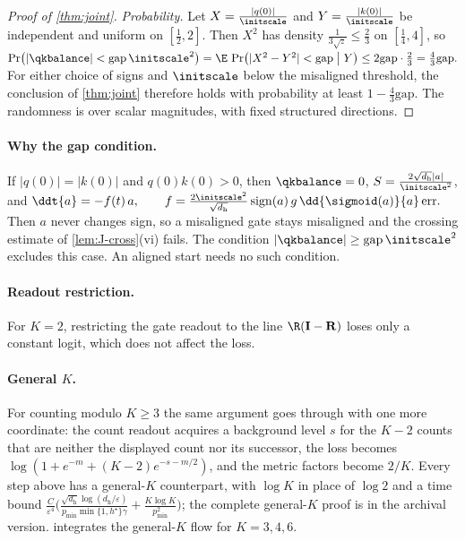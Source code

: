 \begin{proof}[Proof of \cref{thm:joint}]
\emph{Probability.} Let $X=\frac{|q(0)|}{\initscale}$ and $Y=\frac{|k(0)|}{\initscale}$ be independent and uniform on $[\frac{1}{2},2]$. Then $X^2$ has density
$\frac{1}{3\sqrt z}\le\frac{2}{3}$ on $[\frac{1}{4},4]$, so
 $\Pr\bigl(|\qkbalance|<\mathrm{gap}\,\initscale^2\bigr)=\E\,\Pr\bigl(|X^2-Y^2|<\mathrm{gap}\bigm|Y\bigr)\le2\mathrm{gap}\cdot\tfrac{2}{3}=\tfrac{4}{3}\mathrm{gap} .$ 
For either choice of signs and $\initscale$ below the misaligned threshold, the conclusion of \cref{thm:joint} therefore holds with
probability at least $1-\tfrac{4}{3}\mathrm{gap}$. The randomness is over scalar magnitudes, with fixed structured directions.\qedhere
\end{proof}

\paragraph{Why the gap condition.}\label{rem:J-balance} If $|q(0)|=|k(0)|$ and $q(0)k(0)>0$, then $\qkbalance=0$, $S=\frac{2\sqrt{d_{\mathrm h}}|a|}{\initscale^2}$, and
 $\ddt{a}=-f(t)\,a,\qquad f=\frac{2\initscale^2}{\sqrt{d_{\mathrm h}}}\operatorname{sign}(a)\,g\,\dd{\sigmoid(a)}{a}\,\mathrm{err} .$ 
Then $a$ never changes sign, so a misaligned gate stays misaligned and the crossing estimate of \cref{lem:J-cross}(vi) fails. The condition
$|\qkbalance|\ge\mathrm{gap}\,\initscale^2$ excludes this case. An aligned start needs no such condition.

\paragraph{Readout restriction.}\label{rem:J-line}
For $K=2$, restricting the gate readout to the line $\R(\mathbf I-\mathbf R)$ loses only a constant logit, which does not affect the loss.

\paragraph{General $K$.}\label{rem:J-generalK}
For counting modulo $K\ge3$ the same argument goes through with one more coordinate: the count readout acquires a background
level $s$ for the $K-2$ counts that are neither the displayed count nor its successor, the loss becomes
$\log(1+e^{-m}+(K-2)e^{-s-m/2})$, and the metric factors become $2/K$. Every step above has a general-$K$ counterpart, with
$\log K$ in place of $\log2$ and a time bound $\frac{C}{\varepsilon^4}\bigl(\frac{\sqrt{d_{\mathrm h}}\log(d_{\mathrm h}/\varepsilon)}{p_{\min}\min\{1,h^\star\}\gamma}+\frac{K\log K}{p_{\min}^2}\bigr)$;
the complete general-$K$ proof is in the archival version.  integrates the general-$K$ flow for $K=3,4,6$.

